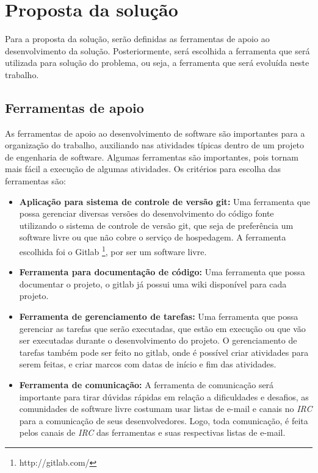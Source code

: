 \section{Proposta da solução}
\label{section:construcao}

Para a proposta da solução, serão definidas as ferramentas
de apoio ao desenvolvimento da solução. Posteriormente, será escolhida a ferramenta
que será utilizada para solução do problema, ou seja, a ferramenta que será evoluída
neste trabalho.

\subsection{Ferramentas de apoio}

As ferramentas de apoio ao desenvolvimento de software são importantes para a
organização do trabalho, auxiliando nas atividades típicas dentro de um projeto
de engenharia de software. Algumas ferramentas são importantes, pois tornam mais fácil
a execução de algumas atividades. Os critérios para escolha das ferramentas são:

\begin{itemize}
  \item \textbf{Aplicação para sistema de controle de versão git:} Uma ferramenta que
  possa gerenciar diversas versões do desenvolvimento do código fonte utilizando
  o sistema de controle de versão git, que seja de preferência um software livre
  ou que não cobre o serviço de hospedagem. A ferramenta escolhida foi o Gitlab \footnote{http://gitlab.com/}, por ser um software livre.
  \item \textbf{Ferramenta para documentação de código:} Uma ferramenta que possa
  documentar o projeto, o gitlab já possui uma wiki disponível para cada projeto.
  \item \textbf{Ferramenta de gerenciamento de tarefas:} Uma ferramenta que possa
  gerenciar as tarefas que serão executadas, que estão em execução ou que vão ser executadas
  durante o desenvolvimento do projeto. O gerenciamento de tarefas também pode ser
  feito no gitlab, onde é possível criar atividades para serem feitas, e criar marcos
  com datas de início e fim das atividades.
  \item \textbf{Ferramenta de comunicação:} A ferramenta de comunicação será
  importante para tirar dúvidas rápidas em relação a dificuldades e desafios, as
  comunidades de software livre costumam usar listas de e-mail e canais no \textit{IRC}
  para a comunicação de seus desenvolvedores. Logo, toda comunicação, é feita
  pelos canais de \textit{IRC} das ferramentas e suas respectivas listas de e-mail.
\end{itemize}


